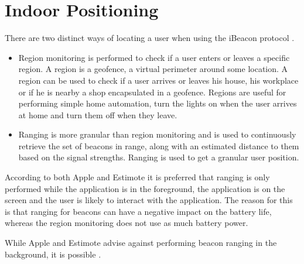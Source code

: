 \section{Indoor Positioning}

There are two distinct ways of locating a user when using the iBeacon protocol \cite{estimote:monitoring-ranging}.

\begin{itemize}
\item Region monitoring is performed to check if a user enters or leaves a specific region. A region is a geofence, \ie a virtual perimeter around some location. A region can be used to check if a user arrives or leaves his house, his workplace or if he is nearby a shop encapsulated in a geofence. Regions are useful for performing simple home automation, \eg turn the lights on when the user arrives at home and turn them off when they leave.
\item Ranging is more granular than region monitoring and is used to continuously retrieve the set of beacons in range, along with an estimated distance to them based on the signal strengths. Ranging is used to get a granular user position.
\end{itemize}

According to both Apple and Estimote it is preferred that ranging is only performed while the application is in the foreground, 
\ie the application is on the screen and the user is likely to interact with the application. 
The reason for this is that ranging for beacons can have a negative impact on the battery life, 
whereas the region monitoring does not use as much battery power.

While Apple and Estimote advise against performing beacon ranging in the background, it is possible \cite{apple:monitoring-ibeacon} \cite{estimote:monitoring-ranging}.



